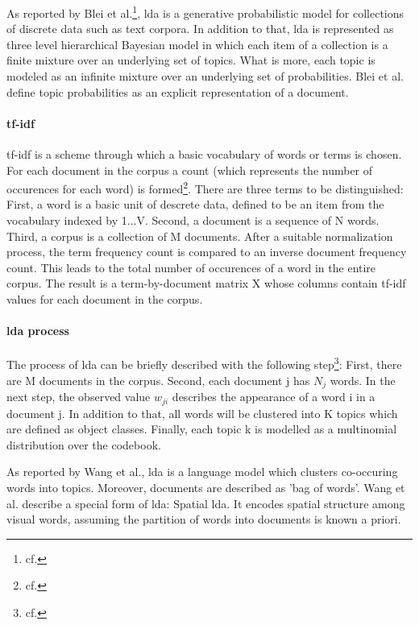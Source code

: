 As reported by Blei et al.\footnote{cf.\autocite{blei_2003}}, \ac{lda} is a generative probabilistic model for collections of discrete data such as text corpora. In addition to that, \ac{lda} is represented as three level hierarchical Bayesian model in which each item of a collection is a finite mixture over an underlying set of topics. What is more, each topic is modeled as an infinite mixture over an underlying set of probabilities. Blei et al. define topic probabilities as an explicit representation of a document.

\paragraph{\ac{tf-idf}}

\ac{tf-idf} is a scheme through which a basic vocabulary of words or terms is chosen. For each document in the corpus a count (which represents the number of occurences for each word) is formed\footnote{cf.\autocite{blei_2003}}. 
There are three terms to be distinguished: First, a word is a basic unit of descrete data, defined to be an item from the vocabulary indexed by {1...V}. Second, a document is a sequence of N words. Third, a corpus is a collection of M documents.
After a suitable normalization process, the term frequency count is compared to an inverse document frequency count. This leads to the total number of occurences of a word in the entire corpus.
The result is a term-by-document matrix X whose columns contain \ac{tf-idf} values for each document in the corpus. 

\paragraph{\ac{lda} process}

The process of \ac{lda} can be briefly described with the following step\footnote{cf.\autocite{wang_2008}}: First, there are M documents in the corpus. Second, each document j has \(N_{j}\) words. In the next step, the observed value \(w_{ji}\) describes the appearance of a word i in a document j. In addition to that, all words will be clustered into K topics which are defined as object classes. Finally, each topic k is modelled as a multinomial distribution over the codebook.

As reported by Wang et al., \ac{lda} is a language model which clusters co-occuring words into topics. Moreover, documents are described as 'bag of words'. 
Wang et al. describe a special form of \ac{lda}: Spatial \ac{lda}. It encodes spatial structure among visual words, assuming the partition of words into documents is known a priori. 


